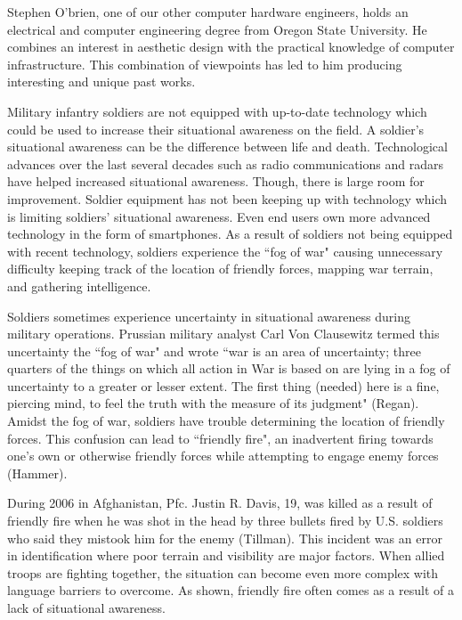 Stephen O'brien, one of our other computer hardware engineers, holds an
electrical and computer engineering degree from Oregon State University. He
combines an interest in aesthetic design with the practical knowledge of
computer infrastructure. This combination of viewpoints has led to him
producing interesting and unique past works.



Military infantry soldiers are not equipped with up-to-date technology
which could be used to increase their situational awareness on the field. A
soldier's situational awareness can be the difference between life and death.
Technological advances over the last several decades such as radio
communications and radars have helped increased situational awareness. Though,
there is large room for improvement. Soldier equipment has not been keeping up
with technology which is limiting soldiers' situational awareness. Even end
users own more advanced technology in the form of smartphones. As a
result of soldiers not being equipped with recent technology, soldiers
experience the ``fog of war" causing unnecessary difficulty keeping track of
the location of friendly forces, mapping war terrain, and gathering
intelligence.


Soldiers sometimes experience uncertainty in situational awareness during
military operations. Prussian military analyst Carl Von Clausewitz termed this
uncertainty the ``fog of war" and wrote ``war is an area of uncertainty; three
quarters of the things on which all action in War is based on are lying in a
fog of uncertainty to a greater or lesser extent. The first thing (needed) here
is a fine, piercing mind, to feel the truth with the measure of its judgment"
(Regan). Amidst the fog of war, soldiers have trouble determining the
location of friendly forces. This confusion can lead to ``friendly fire", an
inadvertent firing towards one's own or otherwise friendly forces while
attempting to engage enemy forces (Hammer).


During 2006 in Afghanistan, Pfc. Justin R. Davis, 19, was killed as a
result of friendly fire when he was shot in the head by three bullets fired by
U.S. soldiers who said they mistook him for the enemy (Tillman).
This incident was an error in identification where poor terrain and visibility
are major factors. When allied troops are fighting together, the situation can
become even more complex with language barriers to overcome. As shown, friendly
fire often comes as a result of a lack of situational awareness.


